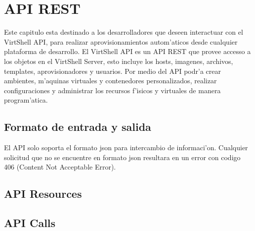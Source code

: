 \chapter{API REST}
\label{capapi}

Este capitulo esta destinado a los desarrolladores que deseen interactuar con el VirtShell API, para realizar aprovisionamientos autom'aticos desde cualquier plataforma de desarrollo. El VirtShell API es un API REST que provee accesso a los objetos en el VirtShell Server, esto incluye los hosts, imagenes, archivos, templates, aprovisionadores y usuarios. Por medio del API podr'a crear ambientes, m'aquinas virtuales y contenedores personalizados, realizar configuraciones y administrar los recursos f'isicos y virtuales de manera program'atica. 

\section{Formato de entrada y salida}
El API solo soporta el formato json para intercambio de informaci'on. Cualquier solicitud que no se encuentre en formato json resultara en un error con codigo 406 (Content Not Acceptable Error).



\section{API Resources}











\section{API Calls}






